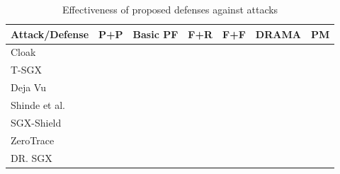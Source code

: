 \begin{table}
	\centering
	\caption{Effectiveness of proposed defenses against attacks}
	\label{tab:one}
	\begin{tabular}{@{}lllllll@{}}
		\toprule
		Attack/Defense & P+P & Basic PF & F+R & F+F & DRAMA & PM \\ \midrule
		Cloak          &\cmark   &\xmark          &\cmark     &\cmark     &\xmark      &\xmark     \\
		T-SGX          &\xmark   &\cmark          &\xmark     &\xmark     &\cmark       &\xmark     \\
		Deja Vu        &\xmark   &\cmark          &\xmark     &\xmark     &\cmark       &\xmark     \\
		Shinde et al.  &\xmark   &\cmark          &\xmark     &\xmark     &\cmark       &\cmark     \\
		SGX-Shield     &\xmark   &\cmark          &\xmark     &\xmark     &\cmark       &\xmark     \\
		ZeroTrace      &\cmark   &\cmark          &\cmark     &\cmark     &\cmark       &\cmark     \\
		DR. SGX        &\cmark   &\xmark          &\cmark     &\cmark     &\xmark       &\xmark     \\
	\end{tabular}
\end{table}
